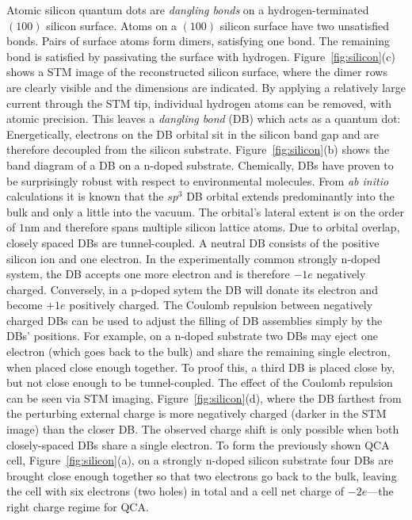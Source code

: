 Atomic silicon quantum dots are \emph{dangling bonds} on a hydrogen-terminated
$(100)$ silicon surface. Atoms on a $(100)$ silicon surface have two unsatisfied
bonds. Pairs of surface atoms form dimers, satisfying one bond. The remaining
bond is satisfied by passivating the surface with hydrogen.
Figure~\ref{fig:silicon}(c) shows a STM image of the reconstructed silicon
surface, where the dimer rows are clearly visible and the dimensions are
indicated. By applying a relatively large current through the STM tip,
individual hydrogen atoms can be removed, with atomic precision. This leaves a
\emph{dangling bond} (DB) which acts as a quantum dot: Energetically, electrons
on the DB orbital sit in the silicon band gap and are therefore decoupled from
the silicon substrate.  Figure~\ref{fig:silicon}(b) shows the band diagram of a
DB on a n-doped substrate.  Chemically, DBs have proven to be surprisingly
robust with respect to environmental molecules. From \emph{ab initio}
calculations it is known that the $sp^3$ DB orbital extends predominantly into
the bulk and only a little into the vacuum. The orbital's lateral extent is on
the order of $1\mathrm{nm}$ and therefore spans multiple silicon lattice atoms.
Due to orbital overlap, closely spaced DBs are tunnel-coupled. A neutral DB
consists of the positive silicon ion and one electron. In the experimentally
common strongly n-doped system, the DB accepts one more electron and is
therefore $-1e$ negatively charged. Conversely, in a p-doped sytem the DB will
donate its electron and become $+1e$ positively charged. The Coulomb repulsion
between negatively charged DBs can be used to adjust the filling of DB
assemblies simply by the DBs' positions. For example, on a n-doped substrate two
DBs may eject one electron (which goes back to the bulk) and share the remaining
single electron, when placed close enough together. To proof this, a third DB is
placed close by, but not close enough to be tunnel-coupled. The effect of the
Coulomb repulsion can be seen via STM imaging, Figure~\ref{fig:silicon}(d),
where the DB farthest from the perturbing external charge is more negatively
charged (darker in the STM image) than the closer DB. The observed charge shift
is only possible when both closely-spaced DBs share a single electron. To form
the previously shown QCA cell, Figure~\ref{fig:silicon}(a), on a strongly
n-doped silicon substrate four DBs are brought close enough together so that two
electrons go back to the bulk, leaving the cell with six electrons (two holes)
in total and a cell net charge of $-2e$---the right charge regime for QCA.

